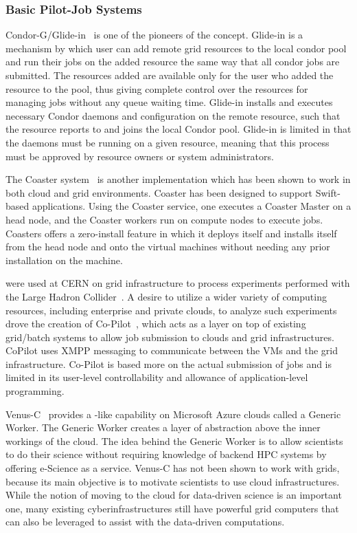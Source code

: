 \documentclass{sig-alternate}
\begin{document}
\subsubsection{Basic Pilot-Job Systems}
Condor-G/Glide-in~\cite{condor-g} is one of the pioneers of the \pilotjob
concept. Glide-in is a mechanism by which user can add remote grid resources
to the local condor pool and run their jobs on the added resource the same way
that all condor jobs are submitted. The resources added are available only for
the user who added the resource to the pool, thus giving complete control over
the resources for managing jobs without any queue waiting time. Glide-in
installs and executes necessary Condor daemons and configuration on the remote
resource, such that the resource reports to and joins the local Condor pool.
Glide-in is limited in that the daemons must be running on a given resource,
meaning that this process must be approved by resource owners or system
administrators.

The Coaster system~\cite{coasters} is another \pilotjob implementation
which has been shown to work in both cloud and grid
environments. Coaster has been designed to support Swift-based applications. Using the Coaster service, one executes a Coaster Master
on a head node, and the Coaster workers run on compute nodes to
execute jobs. Coasters offers a zero-install feature in which it
deploys itself and installs itself from the head node and onto the
virtual machines without needing any prior installation on the
machine. 

\pilotjobs were used at CERN on grid infrastructure to process experiments 
performed with the Large Hadron Collider~\cite{copilot-tr}. 
A desire to utilize a wider variety of computing resources, including 
enterprise and private clouds, to analyze such experiments drove the creation 
of Co-Pilot~\cite{copilot-tr}, which acts as a layer on top of existing
grid/batch systems to allow job submission to clouds and grid infrastructures. 
CoPilot uses XMPP messaging to communicate between the VMs and the grid 
infrastructure. Co-Pilot is based more on the actual
submission of jobs and is limited in its user-level controllability and 
allowance of application-level programming.

Venus-C~\cite{venusc-generic-worker} provides a \pilotjob-like
capability on Microsoft Azure clouds called a Generic Worker. The
Generic Worker creates a layer of abstraction above the inner workings
of the cloud.  The idea behind the Generic Worker is to allow
scientists to do their science without requiring knowledge of backend
HPC systems by offering e-Science as a service. Venus-C has not been
shown to work with grids, because its main objective is to motivate
scientists to use cloud infrastructures.  While the notion of moving
to the cloud for data-driven science is an important one, many
existing cyberinfrastructures still have powerful grid computers that
can also be leveraged to assist with the data-driven computations.
\end{document}
